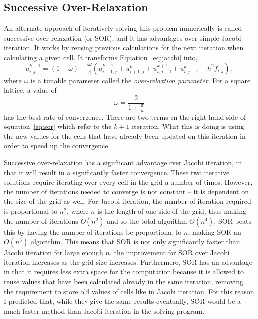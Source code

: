 \subsection{Successive Over-Relaxation}

An alternate approach of iteratively solving this problem numerically is called successive over-relaxation (or SOR), and
it has advantages over simple Jacobi iteration. It works by reusing previous calculations for the next iteration when
calculating a given cell. It transforms Equation~\ref{eq:jacobi} into,
\begin{equation} \label{eq:sor}
u_{i,j}^{k+1} = (1-\omega) + \frac{\omega}{4}\left(u_{i-1,j}^{k+1} + u_{i+1,j}^{k} + u_{i,j-1}^{k+1} + u_{i,j+1}^{k} - h^2 f_{i,j}\right),
\end{equation}
where $\omega$ is a tunable parameter called the \textit{over-relaxtion parameter}. For a square lattice, a value of
$$\omega = \frac{2}{1+\frac{\pi}{n}}$$
has the best rate of convergence\cite{poisson-relax}. There are two terms on the right-hand-side of equation~\ref{eq:sor} which refer to the
$k+1$ iteration. What this is doing is using the new values for the cells that have already been updated on this iteration
in order to speed up the convergence.

Successive over-relaxation has a signfiicant advantage over Jacobi iteration, in that it will result in a significantly faster convergence.
These two iterative solutions require iterating over every cell in the grid a number of times. However, the number of iterations needed to
converge is not constant -- it is dependent on the size of the grid as well. For Jacobi iteration, the number of iteration required is
proportional to $n^2$, where $n$ is the length of one side of the grid, thus making the number of iterations $O(n^2)$ and so the total
algorithm $O(n^4)$. SOR beats this by having the number of iterations be proportional to $n$, making SOR an $O(n^3)$ algorithm\cite{poisson-relax}. This means
that SOR is not only significantly faster than Jacobi iteration for large enough $n$, the improvement for SOR over Jacobi iteration increases
as the grid size increases. Furthermore, SOR has an advantage in that it requires less extra space for the computation because it is allowed
to reuse values that have been calculated already in the same iteration, removing the requirement to store old values of cells like in Jacobi
iteration. For this reason I predicted that, while they give the same results eventually, SOR would be a much faster method than Jacobi
iteration in the solving program.






